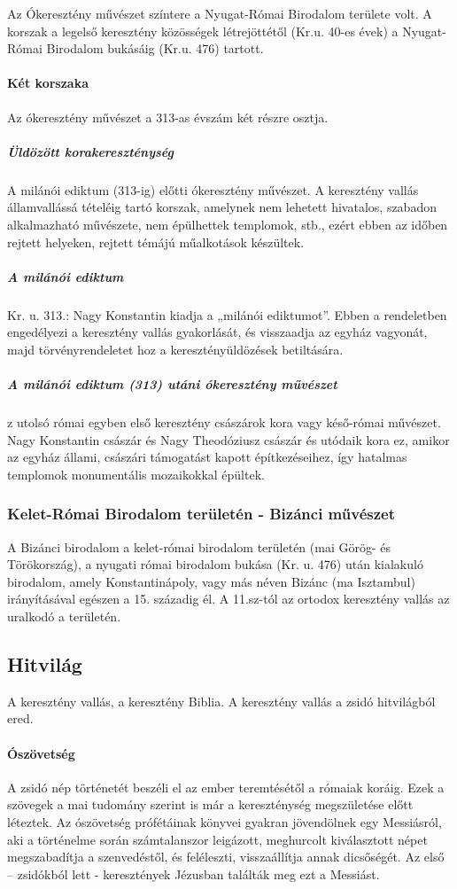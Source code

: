 Az Ókeresztény művészet színtere a Nyugat-Római Birodalom területe volt. A korszak a legelső keresztény közösségek létrejöttétől (Kr.u. 40-es évek) a Nyugat-Római Birodalom bukásáig (Kr.u. 476) tartott.

\paragraph{Két korszaka}
Az ókeresztény művészet a 313-as évszám két részre osztja.

\subparagraph{Üldözött korakereszténység}
A milánói ediktum (313-ig) előtti ókeresztény művészet. A keresztény vallás államvallássá tételéig tartó korszak, amelynek nem lehetett hivatalos, szabadon alkalmazható művészete, nem épülhettek templomok, stb., ezért ebben az időben rejtett helyeken, rejtett témájú műalkotások készültek.

\subparagraph{A milánói ediktum}
Kr. u. 313.: Nagy Konstantin kiadja a „milánói ediktumot”. Ebben a rendeletben engedélyezi a keresztény vallás gyakorlását, és visszaadja az egyház vagyonát, majd törvényrendeletet hoz a keresztényüldözések betiltására.

\subparagraph{A milánói ediktum (313) utáni ókeresztény művészet}
z utolsó római egyben első keresztény császárok kora vagy késő-római művészet. Nagy Konstantin császár és Nagy Theodóziusz császár és utódaik kora ez, amikor az egyház állami, császári támogatást kapott építkezéseihez, így hatalmas templomok monumentális mozaikokkal épültek.

\subsubsection{Kelet-Római Birodalom területén - Bizánci művészet}
A Bizánci birodalom a kelet-római birodalom területén (mai Görög- és Törökország), a nyugati római birodalom bukása (Kr. u. 476) után kialakuló birodalom, amely Konstantinápoly, vagy más néven Bizánc (ma Isztambul) irányításával egészen a 15. századig él. A 11.sz-tól az ortodox keresztény vallás az uralkodó a területén.

\subsection*{Hitvilág}

A keresztény vallás, a keresztény Biblia. A keresztény vallás a zsidó hitvilágból ered.

\paragraph{Ószövetség}
A zsidó nép történetét beszéli el az ember teremtésétől a rómaiak koráig. Ezek a szövegek a mai tudomány szerint is már a kereszténység megszületése előtt léteztek. Az ószövetség prófétáinak könyvei gyakran jövendölnek egy Messiásról, aki a történelme során számtalanszor leigázott, meghurcolt kiválasztott népet megszabadítja a szenvedéstől, és feléleszti, visszaállítja annak dicsőségét. Az első – zsidókból lett - keresztények Jézusban találták meg ezt a Messiást.

